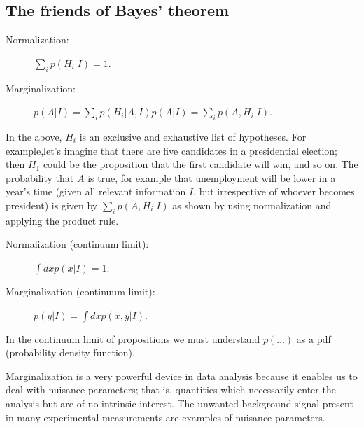 \documentclass[%
oneside,                 %
final,                   %
10pt]{article}
\newenvironment{block_mdfboxadmon}[1][]{
\begin{block_mdfboxmdframed}[frametitle=#1]
}
{
\end{block_mdfboxmdframed}
}
\begin{document}
\subsection{The friends of Bayes' theorem}

\begin{block_mdfboxadmon}[]
\begin{description}
\item[Normalization:] 
  $\sum_i p(H_i|I) = 1$.

\item[Marginalization:] 
  $p(A|I) = \sum_i p(H_i|A,I) p(A|I) = \sum_i p(A,H_i|I)$.
\end{description}

\noindent
In the above, $H_i$ is an exclusive and exhaustive list of hypotheses. For example,let’s imagine that there are five candidates in a presidential election; then $H_1$ could be the proposition that the first candidate will win, and so on. The probability that $A$ is true, for example that unemployment will be lower in a year’s time (given all relevant information $I$, but irrespective of whoever becomes president) is given by $\sum_i p(A,H_i|I)$ as shown by using normalization and applying the product rule.
\end{block_mdfboxadmon} %




\begin{block_mdfboxadmon}[]
\begin{description}
\item[Normalization (continuum limit):] 
  $\int dx p(x|I) = 1$.

\item[Marginalization (continuum limit):] 
  $p(y|I) = \int dx p(x,y|I)$.
\end{description}

\noindent
In the continuum limit of propositions we must understand $p(\ldots)$ as a pdf (probability density function).

Marginalization is a very powerful device in data analysis because it enables us to deal with nuisance parameters; that is, quantities which necessarily enter the analysis but are of no intrinsic interest. The unwanted background signal present in many experimental measurements are examples of nuisance parameters.
\end{block_mdfboxadmon} %



\end{document}
